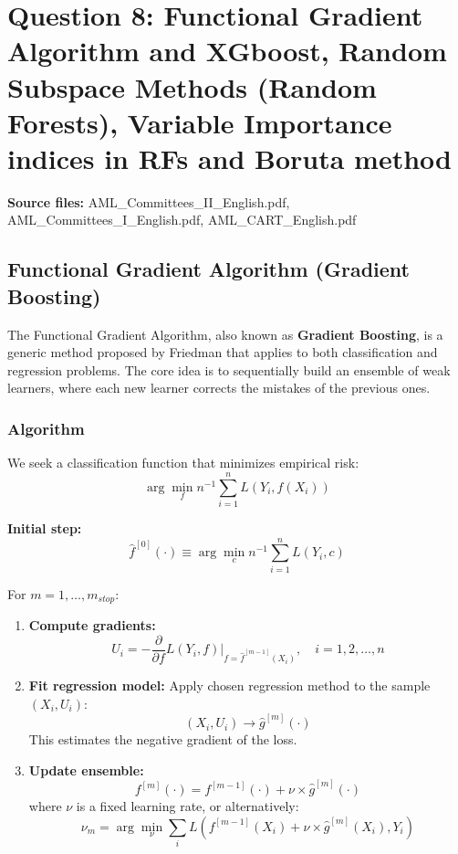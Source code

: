 \documentclass[12pt,a4paper]{article}
\begin{document}
\newpage
\section{Question 8: Functional Gradient Algorithm and XGboost, Random Subspace Methods (Random Forests), Variable Importance indices in RFs and Boruta method}

\textbf{Source files:} AML\_Committees\_II\_English.pdf, AML\_Committees\_I\_English.pdf, AML\_CART\_English.pdf

\subsection{Functional Gradient Algorithm (Gradient Boosting)}

The Functional Gradient Algorithm, also known as \textbf{Gradient Boosting}, is a generic method proposed by Friedman that applies to both classification and regression problems. The core idea is to sequentially build an ensemble of weak learners, where each new learner corrects the mistakes of the previous ones.

\subsubsection{Algorithm}
We seek a classification function that minimizes empirical risk:
\begin{equation}
\arg\min_f n^{-1} \sum_{i=1}^n L(Y_i, f(X_i))
\end{equation}

\textbf{Initial step:} 
\begin{equation}
\hat{f}^{[0]}(\cdot) \equiv \arg\min_c n^{-1} \sum_{i=1}^n L(Y_i, c)
\end{equation}

For $m = 1, \ldots, m_{stop}$:

\begin{enumerate}
    \item \textbf{Compute gradients:}
    \begin{equation}
    U_i = -\frac{\partial}{\partial f} L(Y_i, f) \Big|_{f=\hat{f}^{[m-1]}(X_i)}, \quad i = 1, 2, \ldots, n
    \end{equation}
    
    \item \textbf{Fit regression model:} Apply chosen regression method to the sample $(X_i, U_i)$:
    \begin{equation}
    (X_i, U_i) \rightarrow \hat{g}^{[m]}(\cdot)
    \end{equation}
    This estimates the negative gradient of the loss.
    
    \item \textbf{Update ensemble:}
    \begin{equation}
    f^{[m]}(\cdot) = f^{[m-1]}(\cdot) + \nu \times \hat{g}^{[m]}(\cdot)
    \end{equation}
    where $\nu$ is a fixed learning rate, or alternatively:
    \begin{equation}
    \nu_m = \arg\min_\nu \sum_i L(f^{[m-1]}(X_i) + \nu \times \hat{g}^{[m]}(X_i), Y_i)
    \end{equation}
\end{enumerate}
\end{document}

